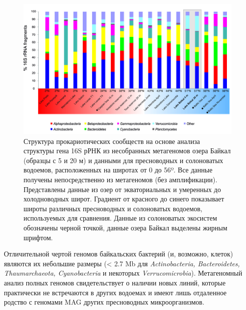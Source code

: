 \documentclass[a4paper,12pt,openany,final]{extreport}
\def\oldcaption{} \let\oldcaption=\caption
\def\caption{\stepcounter{captionsnum}\oldcaption}
\begin{document}
\begin{figure}\centering
  \includegraphics[width=\linewidth]{media/image8.png}
  \caption{Структура прокариотических сообществ на основе анализа
структуры гена 16S рРНК из несобранных метагеномов озера Байкал (образцы
с 5 и 20 м) и данными для пресноводных и солоноватых водоемов,
расположенных на широтах от 0 до 56º. Все данные получены
непосредственно из метагеномов (без амплификации). Представлены данные
из озер от экваториальных и умеренных до холодноводных широт. Градиент
от красного до синего показывает широты различных пресноводных и
солоноватых водоемов, используемых для сравнения. Данные из солоноватых
экосистем обозначены черной точкой, данные озера Байкал выделены жирным
шрифтом.}\label{fig:4-3}
\end{figure}

Отличительной чертой геномов байкальских бактерий (и, возможно, клеток)
являются их небольшие размеры (\textless{} 2.7 Mb для
\emph{Actinobacteria, Bacteroidetes, Thaumarchaeota, Cyanobacteria} и
некоторых \emph{Verrucomicrobia}). Метагеномный анализ полных геномов
свидетельствует о наличии новых линий, которые практически не
встречаются в других водоемах и имеют лишь отдаленное родство с геномами
MAG других пресноводных микроорганизмов.
\end{document}
